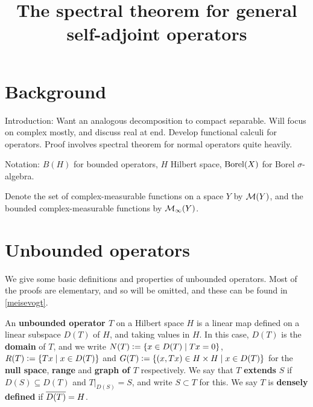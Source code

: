 \documentclass[10pt]{amsart}
\title{The spectral theorem for general self-adjoint operators}
\begin{document}
\maketitle
\section{Background}
Introduction: Want an analogous decomposition to compact separable. Will focus on complex mostly, and discuss real at end. Develop functional calculi for operators. Proof involves spectral theorem for normal operators quite heavily.

Notation: $B(H)$ for bounded operators, $H$ Hilbert space, $\operatorname{Borel}(X)$ for Borel $\sigma$-algebra. 

Denote the set of complex-measurable functions on a space $Y$ by $\mathcal{M}(Y)$, and the bounded complex-measurable functions by $\mathcal{M}_\infty(Y)$. 
\section{Unbounded operators}
We give some basic definitions and properties of unbounded operators. Most of the proofs are elementary, and so will be omitted, and these can be found in \ref{meisevogt}.

An \textbf{unbounded operator $T$} on a Hilbert space $H$ is a linear map defined on a linear subspace $D(T)$ of $H$, and taking values in $H$. In this case, $D(T)$ is the \textbf{domain} of $T$, and we write $N(T) \vcentcolon= \left\{  x \in D(T) \mid Tx = 0  \right\}$, $R(T) \vcentcolon= \left\{  Tx \mid x \in D(T)  \right\}$ and $G(T) \vcentcolon= \left\{  (x, Tx) \in H \times H \mid x \in D(T)  \right\}$ for the \textbf{null space}, \textbf{range} and \textbf{graph of $T$} respectively. We say that $T$ \textbf{extends} $S$ if $D(S) \subseteq D(T)$ and $T|_{D(S)} = S$, and write $S \subset T$ for this. We say $T$ is \textbf{densely defined} if $\overline{D(T)} = H$.
\end{document}
